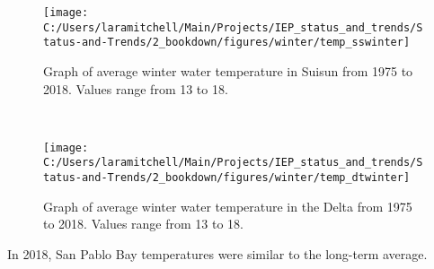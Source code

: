 \documentclass[
]{book}
\begin{document}
\begin{panel-grid}
\begin{columns-nocenter}
\begin{column40}
\end{column40}

\begin{column800}

\begin{expand}

\begin{figure}
\texttt{[image: C:/Users/laramitchell/Main/Projects/IEP\_status\_and\_trends/Status-and-Trends/2\_bookdown/figures/winter/temp\_sswinter]} \caption{Graph of average winter water temperature in Suisun from 1975 to 2018. Values range from 13 to 18.}\label{fig:unnamed-chunk-153}
\end{figure}

\end{expand}

\end{column800}

\begin{column40}

~

\end{column40}

\begin{column800}

\begin{expand}

\begin{figure}
\texttt{[image: C:/Users/laramitchell/Main/Projects/IEP\_status\_and\_trends/Status-and-Trends/2\_bookdown/figures/winter/temp\_dtwinter]} \caption{Graph of average winter water temperature in the Delta from 1975 to 2018. Values range from 13 to 18.}\label{fig:unnamed-chunk-154}
\end{figure}

\end{expand}

\end{column800}

\end{columns-nocenter}

\begin{columns-nocenter}

\begin{column800}

In 2018, San Pablo Bay temperatures were similar to the long-term average.

\end{column800}

\begin{column40}


\end{column40}
\end{columns-nocenter}
\end{panel-grid}
\end{document}
